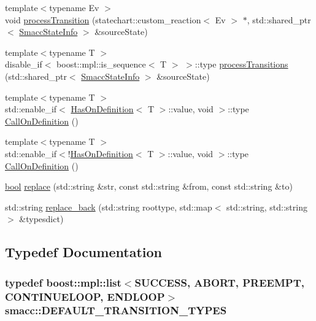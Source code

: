 \begin{DoxyCompactItemize}
\item 
{\footnotesize template$<$typename Ev $>$ }\\void \hyperlink{namespacesmacc_a1f165532f9a9126db41900fbf23a985d}{process\+Transition} (statechart\+::custom\+\_\+reaction$<$ Ev $>$ $\ast$, std\+::shared\+\_\+ptr$<$ \hyperlink{classsmacc_1_1SmaccStateInfo}{Smacc\+State\+Info} $>$ \&source\+State)
\item 
{\footnotesize template$<$typename T $>$ }\\disable\+\_\+if$<$ boost\+::mpl\+::is\+\_\+sequence$<$ T $>$ $>$\+::type \hyperlink{namespacesmacc_a097ffb8059d48bbe45ee8321e92e8878}{process\+Transitions} (std\+::shared\+\_\+ptr$<$ \hyperlink{classsmacc_1_1SmaccStateInfo}{Smacc\+State\+Info} $>$ \&source\+State)
\item 
{\footnotesize template$<$typename T $>$ }\\std\+::enable\+\_\+if$<$ \hyperlink{classsmacc_1_1HasOnDefinition}{Has\+On\+Definition}$<$ T $>$\+::value, void $>$\+::type \hyperlink{namespacesmacc_a380bcca82a996c6c88868251206ad420}{Call\+On\+Definition} ()
\item 
{\footnotesize template$<$typename T $>$ }\\std\+::enable\+\_\+if$<$!\hyperlink{classsmacc_1_1HasOnDefinition}{Has\+On\+Definition}$<$ T $>$\+::value, void $>$\+::type \hyperlink{namespacesmacc_a52c5d314d71f6a1d8658c6f1d26d9135}{Call\+On\+Definition} ()
\item 
\hyperlink{classbool}{bool} \hyperlink{namespacesmacc_af160907752916d32be9c40dc95cd29e0}{replace} (std\+::string \&str, const std\+::string \&from, const std\+::string \&to)
\item 
std\+::string \hyperlink{namespacesmacc_a72fcb6f2d23e716a772176e79495bc53}{replace\+\_\+back} (std\+::string roottype, std\+::map$<$ std\+::string, std\+::string $>$ \&typesdict)
\end{DoxyCompactItemize}


\subsection{Typedef Documentation}
\subsubsection[{\texorpdfstring{D\+E\+F\+A\+U\+L\+T\+\_\+\+T\+R\+A\+N\+S\+I\+T\+I\+O\+N\+\_\+\+T\+Y\+P\+ES}{DEFAULT_TRANSITION_TYPES}}]{\setlength{\rightskip}{0pt plus 5cm}typedef boost\+::mpl\+::list$<${\bf S\+U\+C\+C\+E\+SS}, {\bf A\+B\+O\+RT}, {\bf P\+R\+E\+E\+M\+PT}, {\bf C\+O\+N\+T\+I\+N\+U\+E\+L\+O\+OP}, {\bf E\+N\+D\+L\+O\+OP}$>$ {\bf smacc\+::\+D\+E\+F\+A\+U\+L\+T\+\_\+\+T\+R\+A\+N\+S\+I\+T\+I\+O\+N\+\_\+\+T\+Y\+P\+ES}}\hypertarget{namespacesmacc_a5238572f5e2747391ba919540aaf70bd}{}\label{namespacesmacc_a5238572f5e2747391ba919540aaf70bd}


